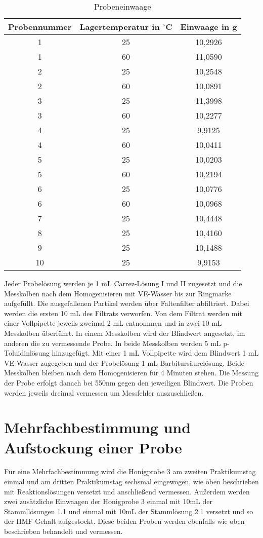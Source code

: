\begin{table}[htbp]
	\centering
	\caption{Probeneinwaage}
		\begin{tabular}{c|c|c} 
			Probennummer & Lagertemperatur in $^\circ$C & Einwaage in g\\
			\hline
			1 & 25 & 10,2926\\
			\hline
			1 & 60 & 11,0590\\
			\hline
			2 & 25 & 10,2548\\
			\hline
			2 & 60 & 10,0891\\
			\hline
			3 & 25 & 11,3998\\
			\hline
			3 & 60 & 10,2277\\
			\hline
			4 & 25 & 9,9125\\
			\hline
			4 & 60 & 10,0411\\
			\hline
			5 & 25 & 10,0203\\
			\hline
			5 & 60 & 10,2194\\
			\hline
			6 & 25 & 10,0776\\
			\hline
			6 & 60 & 10,0968\\
			\hline
			7 & 25 & 10,4448\\
			\hline
			8 & 25 & 10,4160\\
			\hline
			9 & 25 & 10,1488\\
			\hline
			10 & 25 & 9,9153\\
		\end{tabular}
	\label{tab:Probeneinwaage}
\end{table}

Jeder Probelösung werden je 1 mL Carrez-Lösung I und II zugesetzt und die Messkolben nach dem Homogenisieren mit VE-Wasser bis zur Ringmarke aufgefüllt. Die ausgefallenen Partikel werden über Faltenfilter abfiltriert. Dabei werden die ersten 10 mL des Filtrats verworfen. Von dem Filtrat werden mit einer Vollpipette jeweils zweimal 2 mL entnommen und in zwei 10 mL Messkolben überführt. In einem Messkolben wird der Blindwert angesetzt, im anderen die zu vermessende Probe. In beide Messkolben werden 5 mL p-Toluidinlösung hinzugefügt. Mit einer 1 mL Vollpipette wird dem Blindwert 1 mL VE-Wasser zugegeben und der Probelösung 1 mL Barbitursäurelösung. Beide Messkolben bleiben nach dem Homogenisieren für 4 Minuten stehen. Die Messung der Probe erfolgt danach bei 550nm gegen den jeweiligen Blindwert. Die Proben werden jeweils dreimal vermessen um Messfehler auszuschließen.

\section{Mehrfachbestimmung und Aufstockung einer Probe}

Für eine Mehrfachbestimmung wird die Honigprobe 3 am zweiten Praktikumstag einmal und am dritten Praktikumstag sechsmal eingewogen, wie oben beschrieben mit Reaktionslösungen versetzt und anschließend vermessen. Außerdem werden zwei zusätzliche Einwaagen der Honigprobe 3 einmal mit 10mL der Stammllösungen 1.1 und einmal mit 10mL der Stammlösung 2.1 versetzt und so der HMF-Gehalt aufgestockt. Diese beiden Proben werden ebenfalls wie oben beschrieben behandelt und vermessen.

